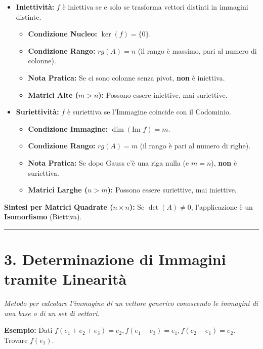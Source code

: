 \documentclass[10pt,a4paper]{article}
\begin{document}
\begin{itemize}
    \item \textbf{Iniettività:} $f$ è iniettiva se e solo se trasforma vettori distinti in immagini distinte.
    \begin{itemize}
        \item \textbf{Condizione Nucleo:} $\ker(f) = \{0\}$.
        \item \textbf{Condizione Rango:} $rg(A) = n$ (il rango è massimo, pari al numero di colonne).
        \item \textbf{Nota Pratica:} Se ci sono colonne senza pivot, \textbf{non} è iniettiva.
        \item \textbf{Matrici Alte ($m > n$):} Possono essere iniettive, mai suriettive.
    \end{itemize}
    
    \item \textbf{Suriettività:} $f$ è suriettiva se l'Immagine coincide con il Codominio.
    \begin{itemize}
        \item \textbf{Condizione Immagine:} $\dim(\text{Im } f) = m$.
        \item \textbf{Condizione Rango:} $rg(A) = m$ (il rango è pari al numero di righe).
        \item \textbf{Nota Pratica:} Se dopo Gauss c'è una riga nulla (e $m=n$), \textbf{non} è suriettiva.
        \item \textbf{Matrici Larghe ($n > m$):} Possono essere suriettive, mai iniettive.
    \end{itemize}
\end{itemize}

\textbf{Sintesi per Matrici Quadrate ($n \times n$):}
Se $\det(A) \neq 0$, l'applicazione è un \textbf{Isomorfismo} (Biettiva).



\vspace{0.5cm}
\hrule
\vspace{0.5cm}

\section*{3. Determinazione di Immagini tramite Linearità}
\textit{Metodo per calcolare l'immagine di un vettore generico conoscendo le immagini di una base o di un set di vettori.}

\textbf{Esempio:} Dati $f(e_1+e_2+e_3)=e_2, f(e_1-e_3)=e_1, f(e_2-e_1)=e_2$. Trovare $f(e_1)$.
\end{document}
